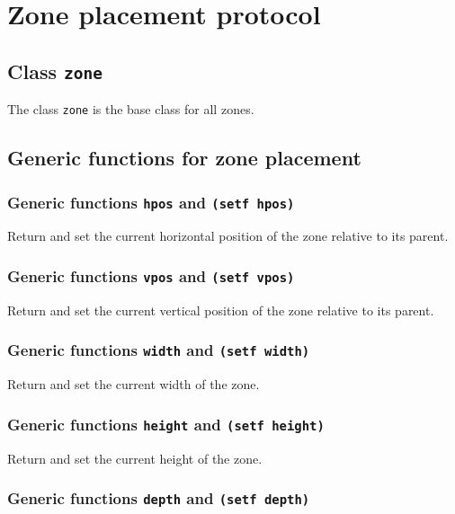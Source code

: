 \documentclass{report}
\begin{document}
\section{Zone placement protocol}

\subsection{Class \texttt{zone}}

The class \texttt{zone} is the base class for all zones. 

\subsection{Generic functions for zone placement}

\subsubsection{Generic functions \texttt{hpos} and \texttt{(setf hpos)}}

Return and set the current horizontal position of the zone relative to
its parent.


\subsubsection{Generic functions \texttt{vpos} and \texttt{(setf vpos)}}

Return and set the current vertical position of the zone relative to
its parent.

\subsubsection{Generic functions \texttt{width} and \texttt{(setf width)}}

Return and set the current width of the zone.

\subsubsection{Generic functions \texttt{height} and \texttt{(setf height)}}

Return and set the current height of the zone.

\subsubsection{Generic functions \texttt{depth} and \texttt{(setf depth)}}
\end{document}
